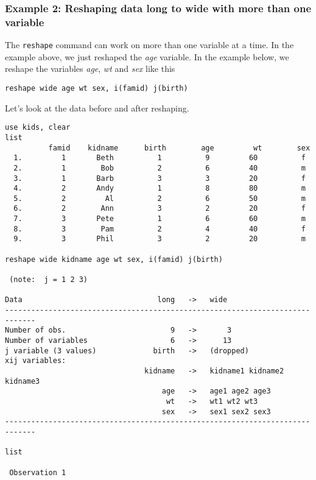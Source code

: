 \subsubsection{Example 2: Reshaping data long to wide with more than one variable}

The \lstinline{reshape} command can work on more than one variable at a time. In the example above, we just reshaped the \textit{age} variable. In the example below, we reshape the variables \textit{age}, \textit{wt} and \textit{sex} like this

\begin{lstlisting}
reshape wide age wt sex, i(famid) j(birth)
\end{lstlisting}

Let's look at the data before and after reshaping.

\begin{lstlisting}
use kids, clear
list
          famid    kidname      birth        age         wt        sex
  1.         1       Beth          1          9         60          f
  2.         1        Bob          2          6         40          m
  3.         1       Barb          3          3         20          f
  4.         2       Andy          1          8         80          m
  5.         2         Al          2          6         50          m
  6.         2        Ann          3          2         20          f
  7.         3       Pete          1          6         60          m
  8.         3        Pam          2          4         40          f
  9.         3       Phil          3          2         20          m

reshape wide kidname age wt sex, i(famid) j(birth)

 (note:  j = 1 2 3)

Data                               long   ->   wide
-----------------------------------------------------------------------------
Number of obs.                        9   ->       3
Number of variables                   6   ->      13
j variable (3 values)             birth   ->   (dropped)
xij variables:
                                kidname   ->   kidname1 kidname2 kidname3
                                    age   ->   age1 age2 age3
                                     wt   ->   wt1 wt2 wt3
                                    sex   ->   sex1 sex2 sex3
-----------------------------------------------------------------------------

list

 Observation 1


\end{lstlisting}
